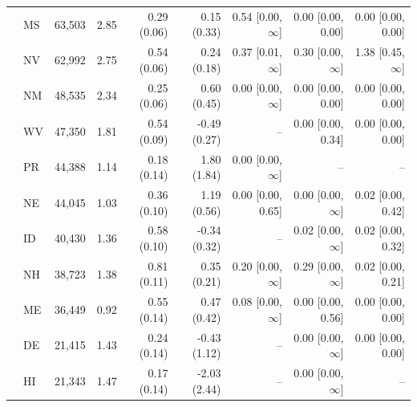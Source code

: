 \begin{tabular}{llrrrrrrr}
 & MS & 63,503 & 2.85 & 0.29 (0.06) & 0.15 (0.33) & 0.54 [0.00, $\infty$] & 0.00 [0.00, 0.00] & 0.00 [0.00, 0.00] \\
 & NV & 62,992 & 2.75 & 0.54 (0.06) & 0.24 (0.18) & 0.37 [0.01, $\infty$] & 0.30 [0.00, $\infty$] & 1.38 [0.45, $\infty$] \\
 & NM & 48,535 & 2.34 & 0.25 (0.06) & 0.60 (0.45) & 0.00 [0.00, $\infty$] & 0.00 [0.00, 0.00] & 0.00 [0.00, 0.00] \\
 & WV & 47,350 & 1.81 & 0.54 (0.09) & -0.49 (0.27) & -- & 0.00 [0.00, 0.34] & 0.00 [0.00, 0.00] \\
 & PR & 44,388 & 1.14 & 0.18 (0.14) & 1.80 (1.84) & 0.00 [0.00, $\infty$] & -- & -- \\
 & NE & 44,045 & 1.03 & 0.36 (0.10) & 1.19 (0.56) & 0.00 [0.00, 0.65] & 0.00 [0.00, $\infty$] & 0.02 [0.00, 0.42] \\
 & ID & 40,430 & 1.36 & 0.58 (0.10) & -0.34 (0.32) & -- & 0.02 [0.00, $\infty$] & 0.02 [0.00, 0.32] \\
 & NH & 38,723 & 1.38 & 0.81 (0.11) & 0.35 (0.21) & 0.20 [0.00, $\infty$] & 0.29 [0.00, $\infty$] & 0.02 [0.00, 0.21] \\
 & ME & 36,449 & 0.92 & 0.55 (0.14) & 0.47 (0.42) & 0.08 [0.00, $\infty$] & 0.00 [0.00, 0.56] & 0.00 [0.00, 0.00] \\
 & DE & 21,415 & 1.43 & 0.24 (0.14) & -0.43 (1.12) & -- & 0.00 [0.00, $\infty$] & 0.00 [0.00, 0.00] \\
 & HI & 21,343 & 1.47 & 0.17 (0.14) & -2.03 (2.44) & -- & 0.00 [0.00, $\infty$] & -- \\
\bottomrule
\end{tabular}
